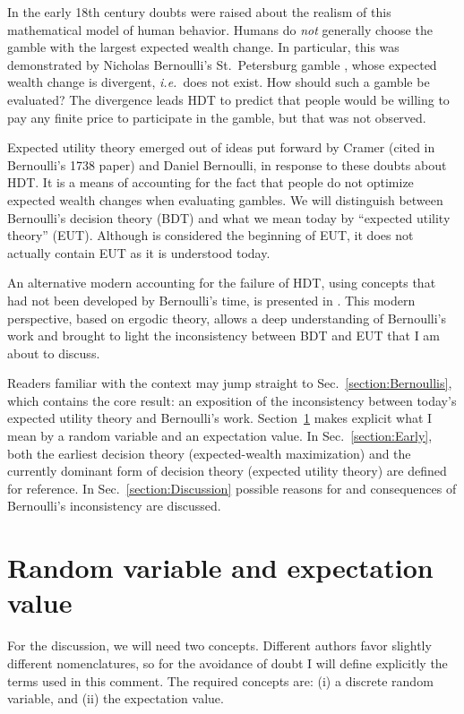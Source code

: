 \documentclass[final]{ectaart}
\newcommand{\ie}{{\it i.e.}\ }
\newcommand{\seclabel}[1]{\label{section:#1}}
\newcommand{\secref}[1]{Sec.~\ref{section:#1}}
\newcommand{\Secref}[1]{Section~\ref{section:#1}}
\theoremstyle{plain}
\begin{document}
In the early 18th century doubts were raised about the realism of this mathematical model of human behavior. Humans do {\it not} generally choose the gamble with the largest expected wealth change. In particular, this was demonstrated by Nicholas Bernoulli's St.~Petersburg gamble \cite[p.~402]{Montmort1713}, whose expected wealth change is divergent, \ie does not exist. How should such a gamble be evaluated? The divergence leads HDT to predict that people would be willing to pay any finite price to participate in the gamble, but that was not observed.

Expected utility theory emerged out of ideas put forward by Cramer (cited in Bernoulli's 1738 paper) and Daniel Bernoulli, in response to these doubts about HDT. It is a means of accounting for the fact that people do not optimize expected wealth changes when evaluating gambles. We will distinguish between Bernoulli's decision theory (BDT) and what we mean today by ``expected utility theory'' (EUT). Although \cite{Bernoulli1738} is considered the beginning of EUT, it does not actually contain EUT as it is understood today.

An alternative modern accounting for the failure of HDT, using concepts that had not been developed by Bernoulli's time, is presented in \citep{PetersGell-Mann2016}. This modern perspective, based on ergodic theory, allows a deep understanding of Bernoulli's work and brought to light the inconsistency between BDT and EUT that I am about to discuss.

Readers familiar with the context may jump straight to \secref{Bernoullis},  which contains the core result: an exposition of the inconsistency between today's expected utility theory and Bernoulli's work. \Secref{Mathematical} makes explicit what I mean by a random variable and an expectation value. In \secref{Early}, both the earliest decision theory (expected-wealth maximization) and the currently dominant form of decision theory (expected utility theory) are defined for reference. In \secref{Discussion} possible reasons for and consequences of Bernoulli's inconsistency are discussed.


\section{Random variable and expectation value}
\seclabel{Mathematical}
For the discussion, we will need two concepts. Different authors favor slightly different nomenclatures, so for the avoidance of doubt I will define explicitly the terms used in this comment. The required concepts are: (i) a discrete random variable, and (ii) the expectation value. 
\end{document}
